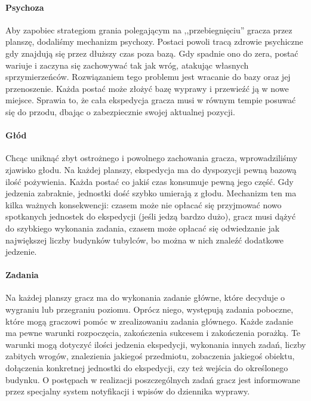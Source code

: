 \documentclass[licencjacka]{pracamgr}
\begin{document}
    \paragraph{Psychoza}
      Aby zapobiec strategiom grania polegającym na ,,przebiegnięciu'' gracza przez planszę, dodaliśmy mechanizm psychozy. Postaci
      powoli tracą zdrowie psychiczne gdy znajdują się przez dłuższy czas poza bazą. Gdy spadnie ono do zera, postać wariuje i
      zaczyna się zachowywać tak jak wróg, atakując własnych sprzymierzeńców. Rozwiązaniem tego problemu jest wracanie do bazy oraz jej przenoszenie.
      Każda postać może złożyć bazę wyprawy i przewieźć ją w nowe miejsce. Sprawia to, że cała ekspedycja gracza musi w równym tempie posuwać się
      do przodu, dbając o zabezpiecznie swojej aktualnej pozycji.
    \paragraph{Głód}
      Chcąc uniknąć zbyt ostrożnego i powolnego zachowania gracza, wprowadziliśmy zjawisko głodu. Na każdej planszy, ekspedycja ma do dyspozycji pewną
      bazową ilość pożywienia. Każda postać co jakiś czas konsumuje pewną jego część. Gdy jedzenia zabraknie, jednostki dość szybko
      umierają z głodu. Mechanizm ten ma kilka ważnych konsekwencji: czasem może nie opłacać się przyjmować nowo spotkanych jednostek do ekspedycji
      (jeśli jedzą bardzo dużo), gracz musi dążyć do szybkiego wykonania zadania, czasem może opłacać się odwiedzanie jak największej liczby budynków
      tubylców, bo można w nich znaleźć dodatkowe jedzenie.
    \paragraph{Zadania}
      Na każdej planszy gracz ma do wykonania zadanie główne, które decyduje o wygraniu lub przegraniu poziomu. Oprócz niego,
      występują zadania poboczne, które mogą graczowi pomóc w zrealizowaniu zadania głównego. Każde zadanie ma pewne warunki
      rozpoczęcia, zakończenia sukcesem i zakończenia porażką. Te warunki mogą dotyczyć ilości jedzenia ekspedycji, wykonania innych zadań,
      liczby zabitych wrogów, znalezienia jakiegoś przedmiotu, zobaczenia jakiegoś obiektu, dołączenia konkretnej jednostki do ekspedycji,
      czy też wejścia do określonego budynku. O postępach w realizacji poszczególnych zadań gracz jest informowane przez specjalny system notyfikacji
      i wpisów do dziennika wyprawy.
\end{document}
